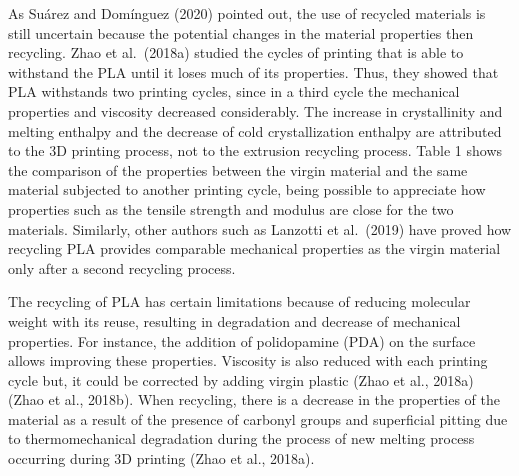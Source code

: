 \documentclass[]{elsarticle} %
\begin{document}
As Suárez and Domínguez (2020) pointed out, the use of recycled
materials is still uncertain because the potential changes in the
material properties then recycling. Zhao et al.~(2018a) studied the
cycles of printing that is able to withstand the PLA until it loses much
of its properties. Thus, they showed that PLA withstands two printing
cycles, since in a third cycle the mechanical properties and viscosity
decreased considerably. The increase in crystallinity and melting
enthalpy and the decrease of cold crystallization enthalpy are
attributed to the 3D printing process, not to the extrusion recycling
process. Table 1 shows the comparison of the properties between the
virgin material and the same material subjected to another printing
cycle, being possible to appreciate how properties such as the tensile
strength and modulus are close for the two materials. Similarly, other
authors such as Lanzotti et al.~(2019) have proved how recycling PLA
provides comparable mechanical properties as the virgin material only
after a second recycling process.

The recycling of PLA has certain limitations because of reducing
molecular weight with its reuse, resulting in degradation and decrease
of mechanical properties. For instance, the addition of polidopamine
(PDA) on the surface allows improving these properties. Viscosity is
also reduced with each printing cycle but, it could be corrected by
adding virgin plastic (Zhao et al., 2018a) (Zhao et al., 2018b). When
recycling, there is a decrease in the properties of the material as a
result of the presence of carbonyl groups and superficial pitting due to
thermomechanical degradation during the process of new melting process
occurring during 3D printing (Zhao et al., 2018a).
\end{document}
